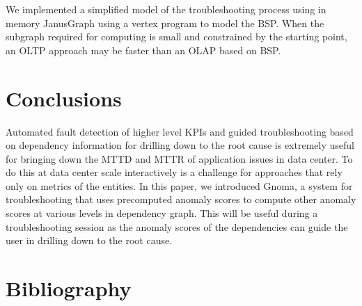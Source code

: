 \documentclass[times, twoside, watermark]{zHenriquesLab-StyleBioRxiv}
\begin{document}
We implemented a simplified model of the troubleshooting process using in memory JanusGraph using a vertex program to model the BSP. When the subgraph required for computing is small and constrained by the starting point, an OLTP approach may be faster than an OLAP based on BSP. 
 
\section*{Conclusions}
Automated fault detection of higher level KPIs and guided troubleshooting based on dependency information for drilling down to the root cause is extremely useful for bringing down the MTTD and MTTR of application issues in data center. To do this at data center scale interactively is a challenge for approaches that rely only on metrics of the entities. In this paper, we introduced Gnoma, a system for troubleshooting that uses precomputed anomaly scores to compute other anomaly scores at various levels in dependency graph. This will be useful during a troubleshooting session as the anomaly scores of the dependencies can guide the user in drilling down to the root cause.


\section*{Bibliography}



\end{document}

